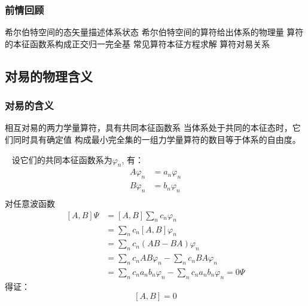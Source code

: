 \begin{frame}
    \frametitle{前情回顾}
    \begin{itemize}
        \Item 希尔伯特空间的态矢量描述体系状态
        \Item 希尔伯特空间的算符给出体系的物理量
        \Item 算符的本征函数系构成正交归一完全基
        \Item 常见算符本征方程求解
        \Item 算符对易关系
    \end{itemize}   
\end{frame} 

\subsection{对易的物理含义}

\begin{frame} 
    \frametitle{对易的含义}
    \begin{enumerate}
        \Item  相互对易的两力学量算符，具有共同本征函数系
        \Item  当体系处于共同的本征态时，它们同时具有确定值
        \Item  构成最小完全集的一组力学量算符的数目等于体系的自由度。
    \end{enumerate}
\end{frame} 

\begin{frame} [allowframebreaks=]
    \证~ 设它们的共同本征函数系为{$\varphi_n$}, 有：
        \begin{equation*}
            \begin{split} 
            A\varphi_n&=a_n \varphi_n \\
            B\varphi_n&=b_n \varphi_n \\
            \end{split}  
        \end{equation*}  
        对任意波函数
        \begin{equation*}
            \begin{split} 
            [A,B]\Psi &= [A,B]\sum_n c_n \varphi_n \\
            &= \sum_n c_n [A,B]\varphi_n \\
            &= \sum_n c_n (AB-BA)\varphi_n\\
            &= \sum_n c_n AB\varphi_n- \sum_n c_n BA\varphi_n\\
            &= \sum_n c_n a_nb_n\varphi_n- \sum_n c_n a_nb_n\varphi_n=0\Psi
            \end{split}  
        \end{equation*}  
        得证： $$[A,B]=0$$
\end{frame} 

